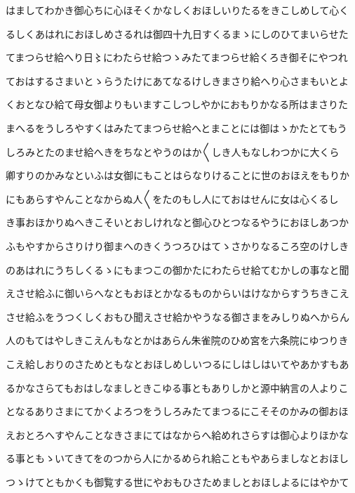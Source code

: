 \documentclass[a4paper,11pt,landscape]{ltjtarticle}
\begin{document}
\par\medskip
はましてわかき御心ちに心ほそくかなしくおほしいりたるをきこしめして心く
\par\medskip
るしくあはれにおほしめさるれは御四十九日すくるまゝにしのひてまいらせた
\par\medskip
てまつらせ給へり日〻にわたらせ給つゝみたてまつらせ給くろき御そにやつれ
\par\medskip
ておはするさまいとゝらうたけにあてなるけしきまさり給へり心さまもいとよ
\par\medskip
くおとなひ給て母女御よりもいますこしつしやかにおもりかなる所はまさりた
\par\medskip
まへるをうしろやすくはみたてまつらせ給へとまことには御はゝかたとてもう
\par\medskip
しろみとたのませ給へきをちなとやうのはか〱しき人もなしわつかに大くら
\par\medskip
卿すりのかみなといふは女御にもことはらなりけることに世のおほえをもりか
\par\medskip
にもあらすやんことなからぬ人〱をたのもし人にておはせんに女は心くるし
\par\medskip
き事おほかりぬへきこそいとおしけれなと御心ひとつなるやうにおほしあつか
\par\medskip
ふもやすからさりけり御まへのきくうつろひはてゝさかりなるころ空のけしき
\par\medskip
のあはれにうちしくるゝにもまつこの御かたにわたらせ給てむかしの事なと聞
\par\medskip
えさせ給ふに御いらへなともおほとかなるものからいはけなからすうちきこえ
\par\medskip
させ給ふをうつくしくおもひ聞えさせ給かやうなる御さまをみしりぬへからん
\par\medskip
人のもてはやしきこえんもなとかはあらん朱雀院のひめ宮を六条院にゆつりき
\par\medskip
こえ給しおりのさためともなとおほしめしいつるにしはしはいてやあかすもあ
\par\medskip
るかなさらてもおはしなましときこゆる事ともありしかと源中納言の人よりこ
\par\medskip
となるありさまにてかくよろつをうしろみたてまつるにこそそのかみの御おほ
\par\medskip
えおとろへすやんことなきさまにてはなからへ給めれさらすは御心よりほかな
\par\medskip
る事ともゝいてきてをのつから人にかるめられ給こともやあらましなとおほし
\par\medskip
つゝけてともかくも御覧する世にやおもひさためましとおほしよるにはやかて
\end{document}
